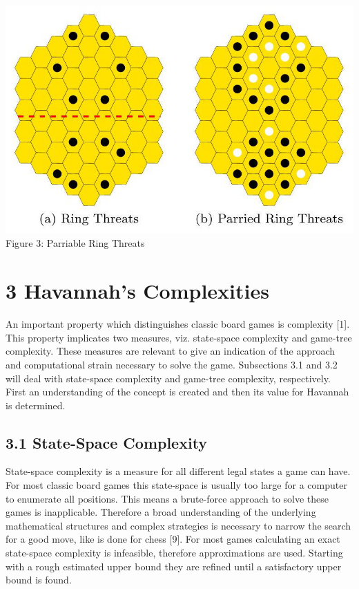 \documentclass[10pt]{article}
\begin{document}
\includegraphics[max width=\textwidth, center]{2024_09_21_575efd6e0a8f951a52dfg-2(2)}\\
Figure 3: Parriable Ring Threats

\section*{3 Havannah's Complexities}
An important property which distinguishes classic board games is complexity [1]. This property implicates two measures, viz. state-space complexity and game-tree complexity. These measures are relevant to give an indication of the approach and computational strain necessary to solve the game. Subsections 3.1 and 3.2 will deal with state-space complexity and game-tree complexity, respectively. First an understanding of the concept is created and then its value for Havannah is determined.

\subsection*{3.1 State-Space Complexity}
State-space complexity is a measure for all different legal states a game can have. For most classic board games this state-space is usually too large for a computer to enumerate all positions. This means a brute-force approach to solve these games is inapplicable. Therefore a broad understanding of the underlying mathematical structures and complex strategies is necessary to narrow the search for a good move, like is done for chess [9]. For most games calculating an exact state-space complexity is infeasible, therefore approximations are used. Starting with a rough estimated upper bound they are refined until a satisfactory upper bound is found.
\end{document}
